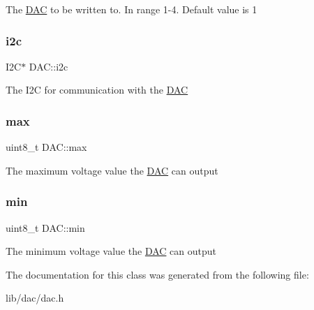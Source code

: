The \hyperlink{class_d_a_c}{D\+AC} to be written to. In range 1-\/4. Default value is 1 \hypertarget{class_d_a_c_a70a9fd9603ee9fd9303628bd23338bf5}{}\label{class_d_a_c_a70a9fd9603ee9fd9303628bd23338bf5} 
\subsubsection{\texorpdfstring{i2c}{i2c}}
{\footnotesize\ttfamily I2C$\ast$ D\+A\+C\+::i2c\hspace{0.3cm}{\ttfamily [private]}}

The I2C for communication with the \hyperlink{class_d_a_c}{D\+AC} \hypertarget{class_d_a_c_a229a81d8ebf43511dfb6815c5cd8f425}{}\label{class_d_a_c_a229a81d8ebf43511dfb6815c5cd8f425} 
\subsubsection{\texorpdfstring{max}{max}}
{\footnotesize\ttfamily uint8\+\_\+t D\+A\+C\+::max\hspace{0.3cm}{\ttfamily [private]}}

The maximum voltage value the \hyperlink{class_d_a_c}{D\+AC} can output \hypertarget{class_d_a_c_aa4f21cf166374cfc6edcd412f4d2072b}{}\label{class_d_a_c_aa4f21cf166374cfc6edcd412f4d2072b} 
\subsubsection{\texorpdfstring{min}{min}}
{\footnotesize\ttfamily uint8\+\_\+t D\+A\+C\+::min\hspace{0.3cm}{\ttfamily [private]}}

The minimum voltage value the \hyperlink{class_d_a_c}{D\+AC} can output 

The documentation for this class was generated from the following file\+:\begin{DoxyCompactItemize}
\item 
lib/dac/dac.\+h\end{DoxyCompactItemize}
